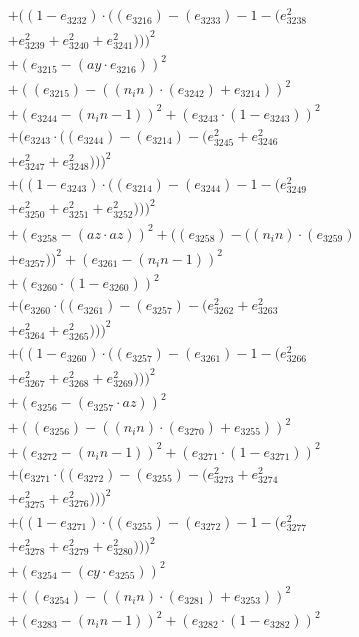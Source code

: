 \documentclass[10pt, a4paper]{article}
\begin{document}
\begin{align*}
& + ((1 - e_{3232})  \cdot  ((e_{3216}) - (e_{3233}) - 1 - (e_{3238}^{2} \\
& + e_{3239}^{2} + e_{3240}^{2} + e_{3241}^{2})))^{2} \\
& + (e_{3215} - (ay  \cdot  e_{3216}))^{2} \\
& + ((e_{3215}) - ((n_in)  \cdot  (e_{3242}) + e_{3214}))^{2} \\
& + (e_{3244} - (n_in - 1))^{2} + (e_{3243}  \cdot  (1 - e_{3243}))^{2} \\
& + (e_{3243}  \cdot  ((e_{3244}) - (e_{3214}) - (e_{3245}^{2} + e_{3246}^{2} \\
& + e_{3247}^{2} + e_{3248}^{2})))^{2} \\
& + ((1 - e_{3243})  \cdot  ((e_{3214}) - (e_{3244}) - 1 - (e_{3249}^{2} \\
& + e_{3250}^{2} + e_{3251}^{2} + e_{3252}^{2})))^{2} \\
& + (e_{3258} - (az  \cdot  az))^{2} + ((e_{3258}) - ((n_in)  \cdot  (e_{3259}) \\
& + e_{3257}))^{2} + (e_{3261} - (n_in - 1))^{2} \\
& + (e_{3260}  \cdot  (1 - e_{3260}))^{2} \\
& + (e_{3260}  \cdot  ((e_{3261}) - (e_{3257}) - (e_{3262}^{2} + e_{3263}^{2} \\
& + e_{3264}^{2} + e_{3265}^{2})))^{2} \\
& + ((1 - e_{3260})  \cdot  ((e_{3257}) - (e_{3261}) - 1 - (e_{3266}^{2} \\
& + e_{3267}^{2} + e_{3268}^{2} + e_{3269}^{2})))^{2} \\
& + (e_{3256} - (e_{3257}  \cdot  az))^{2} \\
& + ((e_{3256}) - ((n_in)  \cdot  (e_{3270}) + e_{3255}))^{2} \\
& + (e_{3272} - (n_in - 1))^{2} + (e_{3271}  \cdot  (1 - e_{3271}))^{2} \\
& + (e_{3271}  \cdot  ((e_{3272}) - (e_{3255}) - (e_{3273}^{2} + e_{3274}^{2} \\
& + e_{3275}^{2} + e_{3276}^{2})))^{2} \\
& + ((1 - e_{3271})  \cdot  ((e_{3255}) - (e_{3272}) - 1 - (e_{3277}^{2} \\
& + e_{3278}^{2} + e_{3279}^{2} + e_{3280}^{2})))^{2} \\
& + (e_{3254} - (cy  \cdot  e_{3255}))^{2} \\
& + ((e_{3254}) - ((n_in)  \cdot  (e_{3281}) + e_{3253}))^{2} \\
& + (e_{3283} - (n_in - 1))^{2} + (e_{3282}  \cdot  (1 - e_{3282}))^{2} \\

\end{align*}
\end{document}
